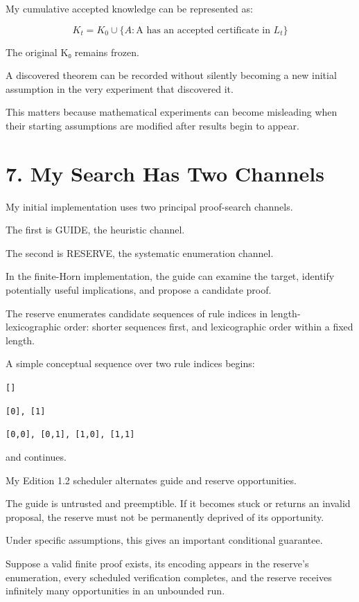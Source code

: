 \documentclass[11pt,letterpaper]{article}
\begin{document}
My cumulative accepted knowledge can be represented as:

\[K_t=K_0\cup\{A:\text{A has an accepted certificate in }L_t\}\]

The original K₀ remains frozen.

A discovered theorem can be recorded without silently becoming a new initial assumption in the very experiment that discovered it.

This matters because mathematical experiments can become misleading when their starting assumptions are modified after results begin to appear.

\section{7. My Search Has Two Channels}\label{my-search-has-two-channels}

My initial implementation uses two principal proof-search channels.

The first is GUIDE, the heuristic channel.

The second is RESERVE, the systematic enumeration channel.

In the finite-Horn implementation, the guide can examine the target, identify potentially useful implications, and propose a candidate proof.

The reserve enumerates candidate sequences of rule indices in length-lexicographic order: shorter sequences first, and lexicographic order within a fixed length.

A simple conceptual sequence over two rule indices begins:

\texttt{{[}{]}}

\texttt{{[}0{]},\ {[}1{]}}

\texttt{{[}0,0{]},\ {[}0,1{]},\ {[}1,0{]},\ {[}1,1{]}}

and continues.

My Edition 1.2 scheduler alternates guide and reserve opportunities.

The guide is untrusted and preemptible. If it becomes stuck or returns an invalid proposal, the reserve must not be permanently deprived of its opportunity.

Under specific assumptions, this gives an important conditional guarantee.

Suppose a valid finite proof exists, its encoding appears in the reserve's enumeration, every scheduled verification completes, and the reserve receives infinitely many opportunities in an unbounded run.
\end{document}
